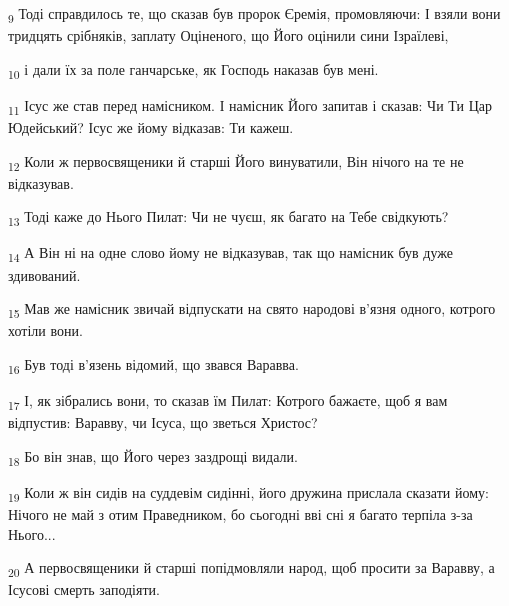 \begin{tcolorbox}
\textsubscript{9} Тоді справдилось те, що сказав був пророк Єремія, промовляючи: І взяли вони тридцять срібняків, заплату Оціненого, що Його оцінили сини Ізраїлеві,
\end{tcolorbox}
\begin{tcolorbox}
\textsubscript{10} і дали їх за поле ганчарське, як Господь наказав був мені.
\end{tcolorbox}
\begin{tcolorbox}
\textsubscript{11} Ісус же став перед намісником. І намісник Його запитав і сказав: Чи Ти Цар Юдейський? Ісус же йому відказав: Ти кажеш.
\end{tcolorbox}
\begin{tcolorbox}
\textsubscript{12} Коли ж первосвященики й старші Його винуватили, Він нічого на те не відказував.
\end{tcolorbox}
\begin{tcolorbox}
\textsubscript{13} Тоді каже до Нього Пилат: Чи не чуєш, як багато на Тебе свідкують?
\end{tcolorbox}
\begin{tcolorbox}
\textsubscript{14} А Він ні на одне слово йому не відказував, так що намісник був дуже здивований.
\end{tcolorbox}
\begin{tcolorbox}
\textsubscript{15} Мав же намісник звичай відпускати на свято народові в'язня одного, котрого хотіли вони.
\end{tcolorbox}
\begin{tcolorbox}
\textsubscript{16} Був тоді в'язень відомий, що звався Варавва.
\end{tcolorbox}
\begin{tcolorbox}
\textsubscript{17} І, як зібрались вони, то сказав їм Пилат: Котрого бажаєте, щоб я вам відпустив: Варавву, чи Ісуса, що зветься Христос?
\end{tcolorbox}
\begin{tcolorbox}
\textsubscript{18} Бо він знав, що Його через заздрощі видали.
\end{tcolorbox}
\begin{tcolorbox}
\textsubscript{19} Коли ж він сидів на суддевім сидінні, його дружина прислала сказати йому: Нічого не май з отим Праведником, бо сьогодні вві сні я багато терпіла з-за Нього...
\end{tcolorbox}
\begin{tcolorbox}
\textsubscript{20} А первосвященики й старші попідмовляли народ, щоб просити за Варавву, а Ісусові смерть заподіяти.
\end{tcolorbox}
